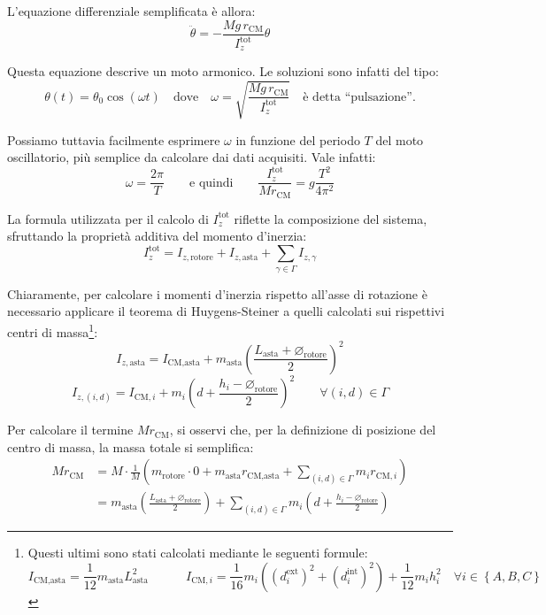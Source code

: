 \documentclass{article}
\newcommand*{\diam}{\varnothing}
\begin{document}
L'equazione differenziale semplificata è allora:
\[ \ddot{\theta} = -\frac{Mg\,r_\text{CM}}{I_z^\text{tot}} \theta \]

Questa equazione descrive un moto armonico. Le soluzioni sono infatti
del tipo:
\[
  \theta(t) = \theta_0\cos(\omega t)
  \quad\text{dove}\quad
  \omega = \sqrt{\frac{Mg\,r_\text{CM}}{I_z^\text{tot}}}\quad\text{è detta “pulsazione”}.
\]

Possiamo tuttavia facilmente esprimere $\omega$ in funzione del periodo
$T$ del moto oscillatorio, più semplice da calcolare dai dati acquisiti.
Vale infatti:
\[
  \omega = \frac{2\pi}{T}
  \qquad\text{e quindi}\qquad
  \frac{I_z^\text{tot}}{Mr_\text{CM}} = g \frac{T^2}{4\pi^2}
\]

La formula utilizzata per il calcolo di $I_z^\text{tot}$ riflette la composizione
del sistema, sfruttando la proprietà additiva del momento d'inerzia:
\[I_z^\text{tot} = I_{z,\text{rotore}} + I_{z,\text{asta}} + \sum_{\gamma\in\Gamma} I_{z,\gamma}\]

Chiaramente, per calcolare i momenti d'inerzia rispetto all'asse di
rotazione è necessario applicare il teorema di Huygens-Steiner
a quelli calcolati sui rispettivi centri di massa\footnote{
  Questi ultimi sono stati calcolati mediante le seguenti formule:
  \[
    I_\text{CM,asta} = \frac{1}{12} m_\text{asta} L_\text{asta}^2
    \qquad\quad
    I_{\text{CM},i} =
      \frac{1}{16}m_i\left(
        (d_i^\text{ext})^2 +
        (d_i^\text{int})^2
      \right) + \frac{1}{12} m_i h_i^2
    \quad\forall i \in \left\{A,B,C\right\}
  \]
}:
\[
  I_{z,\text{asta}} = I_\text{CM,asta} + m_\text{asta}\left(\frac{L_\text{asta} + \diam_\text{rotore}}{2}\right)^2
\]\[
  I_{z,(i,d)} = I_{\text{CM},i} + m_i\left(d + \frac{h_i - \diam_\text{rotore}}{2}\right)^2\qquad\forall(i,d)\in\Gamma
\]

Per calcolare il termine $M r_\text{CM}$, si osservi che, per la
definizione di posizione del centro di massa, la massa totale si
semplifica:
\[\begin{aligned}
  Mr_\text{CM} &= M\cdot \frac{1}{M}\left(
    m_\text{rotore}\cdot 0 + m_\text{asta} r_\text{CM,asta} +
    \sum_{(i,d)\in\Gamma}{m_i r_{\text{CM},i}}
  \right) \\&= m_\text{asta}\left(\frac{L_\text{asta} + \diam_\text{rotore}}{2}\right) +
    \sum_{(i,d)\in\Gamma}{m_i \left(d + \frac{h_i - \diam_\text{rotore}}{2}\right)}
\end{aligned}\]
\end{document}
